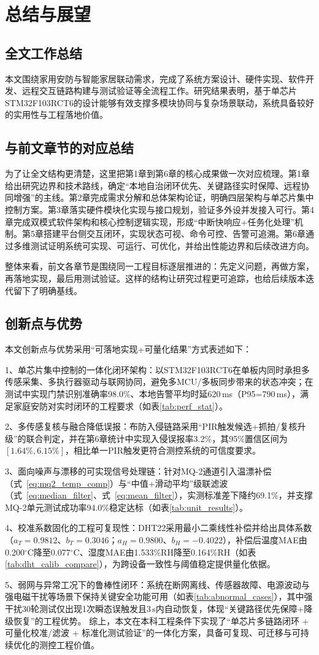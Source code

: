\documentclass[UTF8,12pt,a4paper,oneside]{ctexbook}
\newcommand{\kuan}[1]{\par\noindent\CJKfamily{song}\zihao{-4}#1、}
\numberwithin{equation}{chapter}
\begin{document}
\chapter{总结与展望}
\section{全文工作总结}
本文围绕家用安防与智能家居联动需求，完成了系统方案设计、硬件实现、软件开发、远程交互链路构建与测试验证等全流程工作。研究结果表明，基于单芯片STM32F103RCT6的设计能够有效支撑多模块协同与复杂场景联动，系统具备较好的实用性与工程落地价值。
\section{与前文章节的对应总结}
为了让全文结构更清楚，这里把第1章到第6章的核心成果做一次对应梳理。第1章给出研究边界和技术路线，确定“本地自治闭环优先、关键路径实时保障、远程协同增强”的主线。第2章完成需求分解和总体架构论证，明确四层架构与单芯片集中控制方案。第3章落实硬件模块化实现与接口规划，验证多外设并发接入可行。第4章完成双模式软件架构和核心控制逻辑实现，形成“中断快响应+任务化处理”机制。第5章搭建平台侧交互闭环，实现状态可视、命令可控、告警可追溯。第6章通过多维测试证明系统可实现、可运行、可优化，并给出性能边界和后续改进方向。

整体来看，前文各章节是围绕同一工程目标逐层推进的：先定义问题，再做方案，再落地实现，最后用测试验证。这样的结构让研究过程更可追踪，也给后续版本迭代留下了明确基线。
\section{创新点与优势}
本文创新点与优势采用“可落地实现+可量化结果”方式表述如下：  
\kuan{1}单芯片集中控制的一体化闭环架构：以STM32F103RCT6在单板内同时承担多传感采集、多执行器驱动与联网协同，避免多MCU/多板同步带来的状态冲突；在测试中实现门禁识别准确率98.0\%、本地告警平均时延620\,ms（P95=790\,ms），满足家庭安防对实时闭环的工程要求（如表\ref{tab:perf_stat}）。  
\kuan{2}多传感复核与融合降低误报：布防入侵链路采用“PIR触发候选+抓拍/复核升级”的联合判定，并在第6章统计中实现入侵误报率3.2\%，其95\%置信区间为$[1.64\%,6.15\%]$，相比单一PIR触发更符合测控系统的可信度要求。  
\kuan{3}面向噪声与漂移的可实现信号处理链：针对MQ-2通道引入温漂补偿（式~\eqref{eq:mq2_temp_comp}）与“中值+滑动平均”级联滤波（式~\eqref{eq:median_filter}、式~\eqref{eq:mean_filter}），实测标准差下降约69.1\%，并支撑MQ-2单元测试成功率94.0\%稳定达标（如表\ref{tab:unit_results}）。
\kuan{4}校准系数固化的工程可复现性：DHT22采用最小二乘线性补偿并给出具体系数（$a_T=0.9812$、$b_T=0.3046$；$a_H=0.9800$、$b_H=-0.4022$），补偿后温度MAE由0.200$^\circ$C降至0.077$^\circ$C、湿度MAE由1.533\%RH降至0.164\%RH（如表\ref{tab:dht_calib_compare}），为跨设备一致性与阈值稳定提供量化依据。  
\kuan{5}弱网与异常工况下的鲁棒性闭环：系统在断网离线、传感器故障、电源波动与强电磁干扰等场景下保持关键安全功能可用（如表\ref{tab:abnormal_cases}），其中强干扰30轮测试仅出现1次瞬态误触发且3\,s内自动恢复，体现“关键路径优先保障+降级恢复”的工程优势。  
综上，本文在本科工程条件下实现了“单芯片多链路闭环 + 可量化校准/滤波 + 标准化测试验证”的一体化方案，具备可复现、可迁移与可持续优化的测控工程价值。
\end{document}
